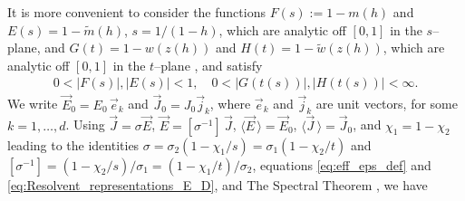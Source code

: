 \documentclass[english,12pt,jmp,graphicx]{revtex4-1}
\begin{document}
It is more convenient to consider the functions
$F(s):=1-m(h)$ and $E(s)=1-\tilde{m}(h)$, $s=1/(1-h)$, which are
analytic off $[0,1]$ in the $s$--plane, and $G(t)=1-w(z(h))$ and
$H(t)=1-\tilde{w}(z(h))$, which are analytic off $[0,1]$ in the
$t$--plane \cite{Bergman:PRC-377,Golden:CMP-473}, and satisfy
%
\begin{align}\label{eq:Stieltjes_Bounds}
  0<|F(s)|,|E(s)|<1, \quad 0<|G(t(s))|,|H(t(s))|<\infty.
\end{align}
%
We write
$\vec{E}_0=E_0\,\vec{e}_k$ and $\vec{J}_0=J_0\vec{j}_k$, where
$\vec{e}_k$ and $\vec{j}_k$ are unit vectors, for some
$k=1,\ldots,d$. Using $\vec{J}=\sigma\vec{E}$, $\vec{E}=[\sigma^{-1}]\,\vec{J}$,
$\langle\vec{E}\,\rangle=\vec{E}_0$, $ \langle\vec{J}\,\rangle=\vec{J}_0$, and
$\chi_1=1-\chi_2$ leading to the identities $\sigma=\sigma_2(1-\chi_1/s)=\sigma_1(1-\chi_2/t)$ and
$[\sigma^{-1}]=(1-\chi_2/s)/\sigma_1=(1-\chi_1/t)/\sigma_2$,   
equations \eqref{eq:eff_eps_def} and
\eqref{eq:Resolvent_representations_E_D}, and The Spectral Theorem  
\cite{Reed-1980}, we have \cite{Golden:CMP-473,Bergman:PRC-377}
\end{document}
